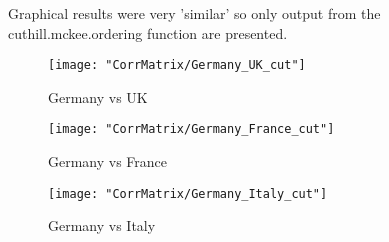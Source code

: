 \documentclass[a4paper]{article}
\begin{document}
Graphical results were very 'similar' so only output from the cuthill.mckee.ordering function are presented.

\begin{figure}[H]
\begin{center}
\texttt{[image: "CorrMatrix/Germany\_UK\_cut"]}
\caption{Germany vs UK}
\label{fig:2}
\end{center}
\end{figure}

\begin{figure}[H]
\begin{center}
\texttt{[image: "CorrMatrix/Germany\_France\_cut"]}
\caption{Germany vs France}
\label{fig:2}
\end{center}
\end{figure}

\begin{figure}[H]
\begin{center}
\texttt{[image: "CorrMatrix/Germany\_Italy\_cut"]}
\caption{Germany vs Italy}
\label{fig:2}
\end{center}
\end{figure}
\end{document}
